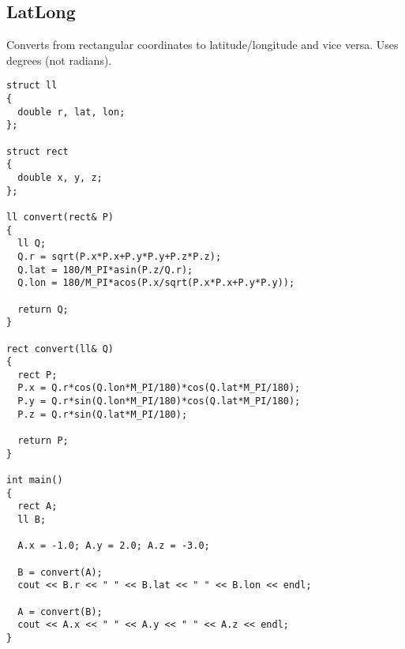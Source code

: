 \documentclass[11pt, oneside]{article}
\begin{document}
\subsection{LatLong}
Converts from rectangular coordinates to latitude/longitude and vice versa. Uses degrees (not radians).
\begin{lstlisting}
struct ll
{
  double r, lat, lon;
};

struct rect
{
  double x, y, z;
};

ll convert(rect& P)
{
  ll Q;
  Q.r = sqrt(P.x*P.x+P.y*P.y+P.z*P.z);
  Q.lat = 180/M_PI*asin(P.z/Q.r);
  Q.lon = 180/M_PI*acos(P.x/sqrt(P.x*P.x+P.y*P.y));
  
  return Q;
}

rect convert(ll& Q)
{
  rect P;
  P.x = Q.r*cos(Q.lon*M_PI/180)*cos(Q.lat*M_PI/180);
  P.y = Q.r*sin(Q.lon*M_PI/180)*cos(Q.lat*M_PI/180);
  P.z = Q.r*sin(Q.lat*M_PI/180);
  
  return P;
}

int main()
{
  rect A;
  ll B;
  
  A.x = -1.0; A.y = 2.0; A.z = -3.0;
  
  B = convert(A);
  cout << B.r << " " << B.lat << " " << B.lon << endl;
  
  A = convert(B);
  cout << A.x << " " << A.y << " " << A.z << endl;
}
\end{lstlisting}
\end{document}
